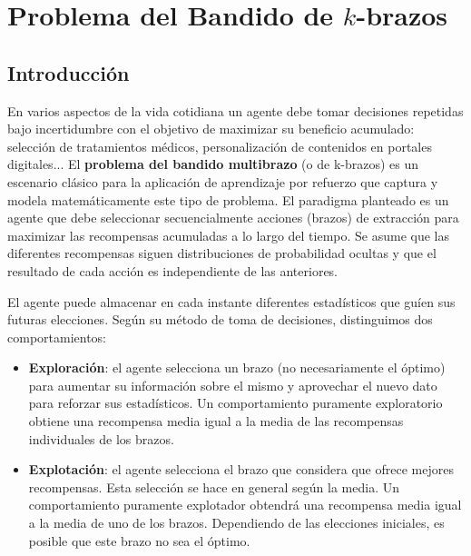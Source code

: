 
\chapter{Problema del Bandido de $k$-brazos}

\section{Introducción }

En varios aspectos de la vida cotidiana un agente debe tomar decisiones repetidas bajo incertidumbre con el objetivo de maximizar su beneficio acumulado: selección de tratamientos médicos, personalización de contenidos en portales digitales... El \textbf{problema del bandido multibrazo} (o de k-brazos) es un escenario clásico para la aplicación de aprendizaje por refuerzo \cite{robbins1952} que captura y modela matemáticamente este tipo de problema. El paradigma
planteado es un agente que debe seleccionar secuencialmente acciones (brazos) de extracción para maximizar las recompensas acumuladas a lo largo del tiempo.
Se asume que las diferentes recompensas siguen distribuciones de
probabilidad ocultas y que el resultado de cada acción es independiente
de las anteriores. 

El agente puede almacenar en cada instante diferentes estadísticos que guíen
sus futuras elecciones. Según su método de toma de decisiones, distinguimos dos
comportamientos:

\begin{itemize}
    \item \textbf{Exploración}: el agente selecciona un brazo (no necesariamente el óptimo)
    para aumentar su información sobre el mismo y aprovechar el nuevo dato para reforzar sus 
    estadísticos. Un comportamiento puramente exploratorio obtiene una recompensa media igual a
    la media de las recompensas individuales de los brazos.
    \item \textbf{Explotación}: el agente selecciona el brazo que considera que ofrece mejores
    recompensas. Esta selección se hace en general según la media. Un comportamiento puramente 
    explotador obtendrá una recompensa media igual a la media de uno de los brazos. Dependiendo
    de las elecciones iniciales, es posible que este brazo no sea el óptimo.
\end{itemize}

